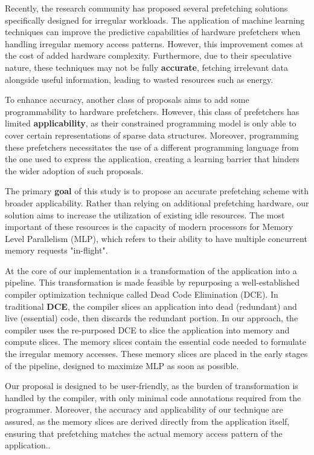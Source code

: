 \documentclass{acaces}
\begin{document}
\begin{enumerate}
Recently, the research community has proposed several prefetching solutions specifically designed for irregular workloads.
The application of machine learning techniques can improve the predictive capabilities of hardware prefetchers when handling irregular memory access patterns.
However, this improvement comes at the cost of added hardware complexity.
Furthermore, due to their speculative nature, these techniques may not be fully \textbf{accurate}, fetching irrelevant data alongside useful information,
leading to wasted resources such as energy.

To enhance accuracy, another class of proposals aims to add some programmability to hardware prefetchers.
However, this class of prefetchers has limited \textbf{applicability},
as their constrained programming model is only able to cover certain representations of sparse data structures.
Moreover, programming these prefetchers necessitates the use of a different programming language from the one used to express the application,
creating a learning barrier that hinders the wider adoption of such proposals.

The primary \textbf{goal} of this study is to propose an accurate prefetching scheme with broader applicability.
Rather than relying on additional prefetching hardware, our solution aims to increase the utilization of existing idle resources.
The most important of these resources is the capacity of modern processors for Memory Level Parallelism (MLP),
which refers to their ability to have multiple concurrent memory requests "in-flight".

At the core of our implementation is a transformation of the application into a pipeline.
This transformation is made feasible by repurposing a well-established compiler optimization technique called Dead Code Elimination (DCE).
In traditional \textbf{DCE}, the compiler slices an application into dead (redundant) and live (essential) code, then discards the redundant portion.
In our approach, the compiler uses the re-purposed DCE to slice the application into memory and compute slices.
The memory slices contain the essential code needed to formulate the irregular memory accesses.
These memory slices are placed in the early stages of the pipeline, designed to maximize MLP as soon as possible.

Our proposal is designed to be user-friendly, as the burden of transformation is handled by the compiler, with only minimal code annotations required from the programmer.
Moreover, the accuracy and applicability of our technique are assured, as the memory slices are derived directly from the application itself,
ensuring that prefetching matches the actual memory access pattern of the application..


\end{enumerate}
\end{document}
